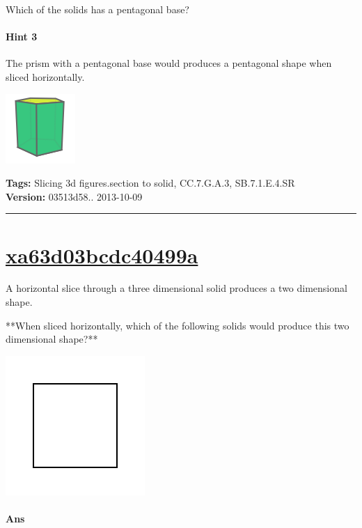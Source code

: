 \documentclass[twocolumn,10pt]{article}
\def\shrinkfactor{0.4}
\begin{document}
Which of the solids has a pentagonal base?

\paragraph{Hint 3}The prism with a pentagonal base would produces a pentagonal shape when sliced horizontally.


\includegraphics[scale=\shrinkfactor]{figures/714aa411c23dfb02df032183d703d78050ecb5ae.png}



\medskip
\noindent
\textbf{Tags:} {\footnotesize Slicing 3d figures.section to solid, CC.7.G.A.3, SB.7.1.E.4.SR}\\
\textbf{Version:} 03513d58.. 2013-10-09
\smallskip\hrule





\section{\href{https://www.khanacademy.org/devadmin/content/items/xa63d03bcdc40499a}{xa63d03bcdc40499a}}

\noindent
A horizontal slice through a three dimensional solid produces a two dimensional shape.

**When sliced horizontally, which of the following solids would produce this two dimensional shape?**   

\includegraphics[scale=\shrinkfactor]{figures/cb9770c6111993072743c8d1e6fe4ea316f56162.png} 


\paragraph{Ans} 
\end{document}
